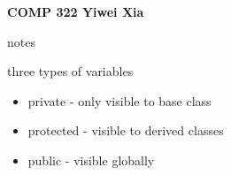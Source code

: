 \documentclass[11pt]{article}
\begin{document}

\thispagestyle{empty}

\noindent \textbf{COMP 322 \hfill Yiwei Xia}
\begin{center}
{\LARGE notes}
\end{center}

\begin{description}

\item three types of variables
\begin{itemize}
	\item private - only visible to base class
	\item protected - visible to derived classes
	\item public - visible globally
\end{itemize}
  

\end{description}
\end{document}
